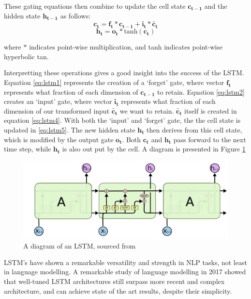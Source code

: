 These gating equations then combine to update the cell state $\mathbf{c_{t-1}}$ and the hidden state $\mathbf{h_{t-1}}$ as follows: 
\begin{equation}
    \mathbf{c_t} = \mathbf{f_t} * \mathbf{c_{t-1}} + \mathbf{i_t} * \mathbf{\tilde{c_t}}
    \label{eq:lstm5}
\end{equation}
\begin{equation}
    \mathbf{h_t} = \mathbf{o_t} * \text{tanh}(\mathbf{c_t})
    \label{eq:lstm6}
\end{equation}

where  $*$ indicates point-wise multiplication, and tanh indicates point-wise hyperbolic tan.

Interpretting these operations gives a good insight into the success of the LSTM.  
Equation \ref{eq:lstm1} represents the creation of a `forget' gate, where vector $\mathbf{f_t}$ represents what fraction of each dimension of $\mathbf{c_{t-1}}$ to retain. 
Equation \ref{eq:lstm2}  creates an `input' gate, where vector $\mathbf{i_t}$ represents what fraction of each dimension of our transformed input $\mathbf{\tilde{c_{t}}}$ we want to retain.  
$\mathbf{\tilde{c_{t}}}$ itself is created in equation \ref{eq:lstm4}. With both the `input' and `forget' gate, the  the cell state is updated in \ref{eq:lstm5}. 
The new hidden state $\mathbf{h_{t}}$ then derives from this cell state, which is modified by the output gate $\mathbf{o_t}$. 
Both $\mathbf{c_{t}}$ and $\mathbf{h_{t}}$ pass forward to the next time step, while $\mathbf{h_{t}}$ is also out put by the cell. 
A diagram is presented in Figure \ref{fig:lstm_colah}

\begin{figure}[tb]
    \centering
    \includegraphics[width=\linewidth]{ModelPics/LSTMcolah.png}
    \caption{A diagram of an LSTM, sourced from \cite{noauthor_understanding_nodate}}
    \label{fig:lstm_colah}{}
\end{figure}

LSTM's have shown a remarkable versatility and strength in NLP tasks, not least in language modelling. A remarkable study of language modelling in 2017 showed that well-tuned LSTM architectures still surpass more recent and complex architecture, and can achieve state of the art results, despite their simplicity\cite{melis_state_2017}.

